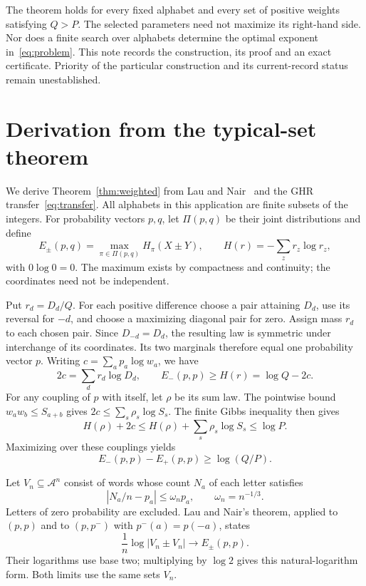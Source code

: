 \documentclass[11pt,a4paper]{article}
\newcommand{\A}{\mathcal A}
\begin{document}
The theorem holds for every fixed alphabet and every set of positive
weights satisfying $Q>P$. The selected parameters need not maximize its
right-hand side. Nor does a finite search over alphabets determine the
optimal exponent in~\eqref{eq:problem}. This note records the construction,
its proof and an exact certificate. Priority of the particular construction
and its current-record status remain unestablished.

\appendix
\section{Derivation from the typical-set theorem}\label{app:entropy}

We derive Theorem~\ref{thm:weighted} from
Lau and Nair~\cite[Theorem~10, v3]{launair} and the GHR
transfer~\eqref{eq:transfer}. All alphabets in this application are finite
subsets of the integers. For probability vectors $p,q$, let $\Pi(p,q)$
be their joint distributions and define
\[
 E_\pm(p,q)=\max_{\pi\in\Pi(p,q)}H_\pi(X\pm Y),
 \qquad H(r)=-\sum_z r_z\log r_z,
\]
with $0\log0=0$. The maximum exists by compactness and continuity;
the coordinates need not be independent.

Put $r_d=D_d/Q$. For each positive difference choose a pair attaining
$D_d$, use its reversal for $-d$, and choose a maximizing diagonal pair
for zero. Assign mass $r_d$ to each chosen pair. Since $D_{-d}=D_d$,
the resulting law is symmetric under interchange of its coordinates.
Its two marginals therefore equal one probability vector $p$. Writing
$c=\sum_a p_a\log w_a$, we have
\[
 2c=\sum_d r_d\log D_d,
 \qquad
 E_-(p,p)\ge H(r)=\log Q-2c.
\]
For any coupling of $p$ with itself, let $\rho$ be its sum law.
The pointwise bound $w_aw_b\le S_{a+b}$ gives
$2c\le\sum_s\rho_s\log S_s$. The finite Gibbs inequality then gives
\[
 H(\rho)+2c
 \le H(\rho)+\sum_s\rho_s\log S_s
 \le\log P.
\]
Maximizing over these couplings yields
\begin{equation}\label{eq:entropy-gap}
 E_-(p,p)-E_+(p,p)\ge\log(Q/P).
\end{equation}

Let $V_n\subseteq\A^n$ consist of words whose count $N_a$ of each
letter satisfies
\[
 |N_a/n-p_a|\le\omega_np_a,
 \qquad \omega_n=n^{-1/3}.
\]
Letters of zero probability are excluded. Lau and Nair's theorem,
applied to $(p,p)$ and to $(p,p^-)$ with $p^-(a)=p(-a)$, states
\begin{equation}\label{eq:typical-limits}
 \frac1n\log|V_n\pm V_n|\longrightarrow E_\pm(p,p).
\end{equation}
Their logarithms use base two; multiplying by $\log2$ gives this
natural-logarithm form. Both limits use the same sets $V_n$.
\end{document}
